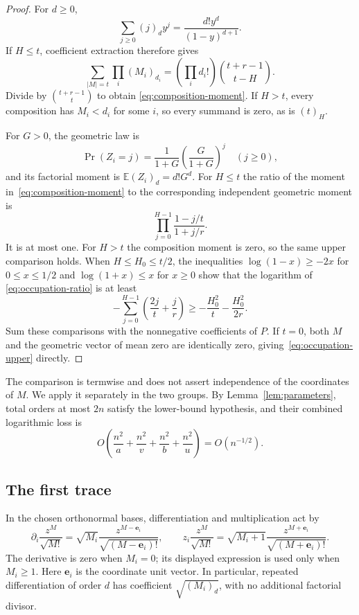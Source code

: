 \begin{proof}
For $d\ge0$,
\[
  \sum_{j\ge0}(j)_d y^j=\frac{d!y^d}{(1-y)^{d+1}}.
\]
If $H\le t$, coefficient extraction therefore gives
\[
  \sum_{|M|=t}\prod_i(M_i)_{d_i}
    =\left(\prod_i d_i!\right)
       \binom{t+r-1}{t-H}.
\]
Divide by $\binom{t+r-1}{t}$ to obtain
\eqref{eq:composition-moment}.  If $H>t$, every composition has
$M_i<d_i$ for some $i$, so every summand is zero, as is $(t)_H$.

For $G>0$, the geometric law is
\[
  \Pr(Z_i=j)=\frac1{1+G}\left(\frac{G}{1+G}\right)^j
  \quad(j\ge0),
\]
and its factorial moment is $\mathbb E(Z_i)_d=d!G^d$.  For $H\le t$
the ratio of the moment in~\eqref{eq:composition-moment} to the
corresponding independent geometric moment is
\begin{equation}
  \prod_{j=0}^{H-1}\frac{1-j/t}{1+j/r}.
  \label{eq:occupation-ratio}
\end{equation}
It is at most one.  For $H>t$ the composition moment is zero, so the
same upper comparison holds.  When $H\le H_0\le t/2$, the inequalities
$\log(1-x)\ge-2x$ for $0\le x\le1/2$ and
$\log(1+x)\le x$ for $x\ge0$ show that the logarithm of
\eqref{eq:occupation-ratio} is at least
\[
  -\sum_{j=0}^{H-1}\left(\frac{2j}{t}+\frac{j}{r}\right)
  \ge -\frac{H_0^2}{t}-\frac{H_0^2}{2r}.
\]
Sum these comparisons with the nonnegative coefficients of $P$.
If $t=0$, both $M$ and the geometric vector of mean zero are identically
zero, giving~\eqref{eq:occupation-upper} directly.
\end{proof}

The comparison is termwise and does not assert independence of the
coordinates of $M$.  We apply it separately in the two groups.
By Lemma~\ref{lem:parameters}, total orders at most $2n$ satisfy the
lower-bound hypothesis, and their combined logarithmic loss is
\begin{equation}
  O\left(\frac{n^2}{a}+\frac{n^2}{v}
          +\frac{n^2}{b}+\frac{n^2}{u}\right)
  =O(n^{-1/2}).
  \label{eq:occupation-loss}
\end{equation}

\subsection{The first trace}

In the chosen orthonormal bases, differentiation and multiplication
act by
\[
  \partial_i\frac{z^M}{\sqrt{M!}}
    =\sqrt{M_i}\frac{z^{M-\mathbf e_i}}{\sqrt{(M-\mathbf e_i)!}},
  \qquad
  z_i\frac{z^M}{\sqrt{M!}}
    =\sqrt{M_i+1}\frac{z^{M+\mathbf e_i}}{\sqrt{(M+\mathbf e_i)!}}.
\]
The derivative is zero when $M_i=0$; its displayed expression is used
only when $M_i\ge1$.  Here $\mathbf e_i$ is the coordinate unit vector.
In particular, repeated differentiation of order $d$ has coefficient
$\sqrt{(M_i)_d}$, with no additional factorial divisor.

